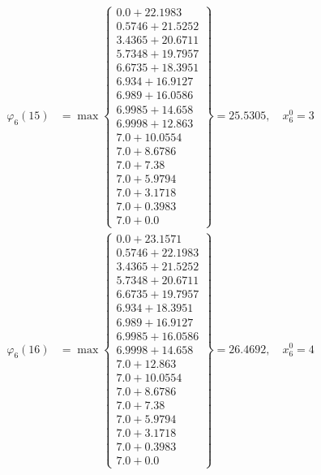 \documentclass{article}
\begin{document}
\begin{align*}
  
\varphi_{6}(15) &= \max \left\{ \begin{array}{c}
0.0 + 22.1983 \\
 0.5746 + 21.5252 \\
 3.4365 + 20.6711 \\
 5.7348 + 19.7957 \\
 6.6735 + 18.3951 \\
 6.934 + 16.9127 \\
 6.989 + 16.0586 \\
 6.9985 + 14.658 \\
 6.9998 + 12.863 \\
 7.0 + 10.0554 \\
 7.0 + 8.6786 \\
 7.0 + 7.38 \\
 7.0 + 5.9794 \\
 7.0 + 3.1718 \\
 7.0 + 0.3983 \\
 7.0 + 0.0
\end{array} \right\}=25.5305,\quad x_{6}^0=3\\
  
  
  
  
\varphi_{6}(16) &= \max \left\{ \begin{array}{c}
0.0 + 23.1571 \\
 0.5746 + 22.1983 \\
 3.4365 + 21.5252 \\
 5.7348 + 20.6711 \\
 6.6735 + 19.7957 \\
 6.934 + 18.3951 \\
 6.989 + 16.9127 \\
 6.9985 + 16.0586 \\
 6.9998 + 14.658 \\
 7.0 + 12.863 \\
 7.0 + 10.0554 \\
 7.0 + 8.6786 \\
 7.0 + 7.38 \\
 7.0 + 5.9794 \\
 7.0 + 3.1718 \\
 7.0 + 0.3983 \\
 7.0 + 0.0
\end{array} \right\}=26.4692,\quad x_{6}^0=4\\
  
  
  

\end{align*}
\end{document}
